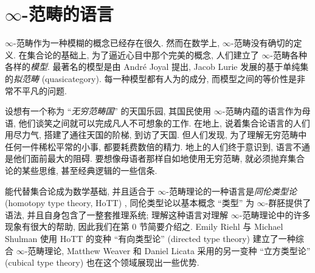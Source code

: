 \chapter{$\infty$-范畴的语言}







$\infty$-范畴作为一种模糊的概念已经存在很久. 然而在数学上, $\infty$-范畴没有确切的定义. 在集合论的基础上, 为了逼近心目中那个完美的概念, 人们建立了 $\infty$-范畴各种各样的\emph{模型}. 最著名的模型是由 Andr\'e Joyal 提出, Jacob Lurie \cite{HTT} 发展的基于单纯集的\emph{拟范畴} (quasicategory). 每一种模型都有人为的成分, 而模型之间的等价性是非常不平凡的问题. %

设想有一个称为 ``\emph{无穷范畴国}'' 的天国乐园, 其国民使用 $\infty$-范畴内蕴的语言作为母语, 他们谈笑之间就可以完成凡人不可想象的工作. 在地上, 说着集合论语言的人们用尽力气, 搭建了通往天国的阶梯, 到访了天国. 但人们发现, 为了理解无穷范畴中任何一件稀松平常的小事, 都要耗费数倍的精力. 地上的人们终于意识到, 语言不通是他们面前最大的阻碍. 要想像母语者那样自如地使用无穷范畴, 就必须抛弃集合论的某些思维, 甚至经典逻辑的一些信条.

能代替集合论成为数学基础, 并且适合于 $\infty$-范畴理论的一种语言是\emph{同伦类型论} (homotopy type theory, HoTT) \cite{hottbook}, 同伦类型论以基本概念 ``类型'' 为 $\infty$-群胚提供了语法, 并且自身包含了一整套推理系统; 理解这种语言对理解 $\infty$-范畴理论中的许多现象有很大的帮助, 因此我们在第 0 节简要介绍之. Emily Riehl 与 Michael Shulman \cite{riehl2023typetheorysyntheticinftycategories} 使用 HoTT 的变种 ``有向类型论'' (directed type theory) 建立了一种综合 $\infty$-范畴理论, Matthew Weaver 和 Daniel Licata 采用的另一变种 ``立方类型论'' (cubical type theory) 也在这个领域展现出一些优势.


